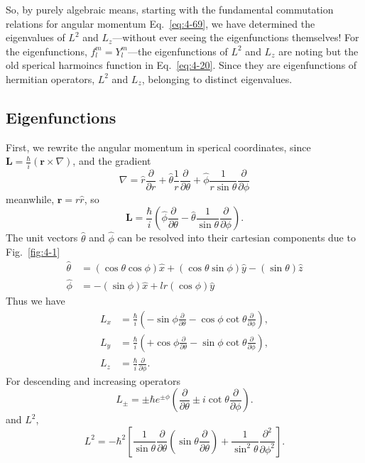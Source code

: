 So, by purely algebraic means, starting with the fundamental commutation relations for angular momentum Eq.~\eqref{eq:4-69}, we have determined the eigenvalues of $L^2$ and $L_z$---without ever seeing the eigenfunctions themselves!
For the eigenfunctions, $f_l^m=Y_l^m$---the eigenfunctions of $L^2$ and $L_z$ are noting but the old sperical harmoincs function in Eq.~\eqref{eq:4-20}.
Since they are eigenfunctions of hermitian operators, $L^2$ and $L_z$, belonging to distinct eigenvalues.

\subsection{Eigenfunctions}
First, we rewrite the angular momentum in sperical coordinates, since $\mathbf{L} = \frac{\hbar}{i} \left( \mathbf{r} \times \nabla \right)$, and the gradient
\begin{equation}
  \label{eq:4-86}
  \nabla = \hat{r} \frac{\partial}{\partial r} + \hat{\theta} \frac{1}{r} \frac{\partial}{\partial \theta} + \hat{\phi} \frac{1}{r\sin\theta} \frac{\partial}{\partial \phi}
\end{equation}
meanwhile, $\mathbf{r}= r \hat{r}$, so
\begin{equation}
  \label{eq:4-87}
  \mathbf{L} = \frac{\hbar}{i} \left( \hat{\phi} \frac{\partial}{\partial \theta} - \hat{\theta} \frac{1}{\sin \theta} \frac{\partial}{\partial \phi} \right) .
\end{equation}
The unit vectors $\hat{\theta}$ and $\hat{\phi}$ can be resolved into their cartesian components due to Fig.~\ref{fig:4-1}
\begin{align}
  \label{eq:4-88}
  \hat{\theta} &= \left( \cos\theta \cos\phi \right) \hat{x} + \left( \cos\theta \sin\phi \right) \hat{y} - \left( \sin\theta \right) \hat{z} \\
  \label{eq:4-49}
  \hat{\phi} &= -\left( \sin\phi \right) \hat{x} + lr(\cos\phi) \hat{y}
\end{align}
Thus we have
\begin{align}
  \label{eq:4-90}
  L_x &= \frac{\hbar}{i} \left( -\sin\phi \frac{\partial}{\partial \theta} - \cos\phi \cot \theta \frac{\partial}{\partial \phi} \right),\\
  \label{eq:4-91}
  L_y &= \frac{\hbar}{i} \left( +\cos\phi \frac{\partial}{\partial \theta} - \sin\phi \cot \theta \frac{\partial}{\partial \phi} \right),\\
  \label{eq:4-92}
  L_z &= \frac{\hbar}{i} \frac{\partial}{\partial \phi}.
\end{align}
For descending and increasing operators
\begin{equation}
  \label{eq:4-93}
  L_{\pm} = \pm \hbar e^{\pm \phi} \left( \frac{\partial}{\partial \theta} \pm i \cot \theta \frac{\partial}{\partial \phi} \right).
\end{equation}
and $L^2$,
\begin{equation}
  \label{eq:4-94}
  L^2 = -\hbar^2 \left[ \frac{1}{\sin\theta} \frac{\partial}{\partial \theta} \left( \sin\theta \frac{\partial}{\partial \theta} \right) + \frac{1}{\sin^{2} \theta} \frac{\partial^{2}}{\partial \phi^{2}} \right] .
\end{equation}


